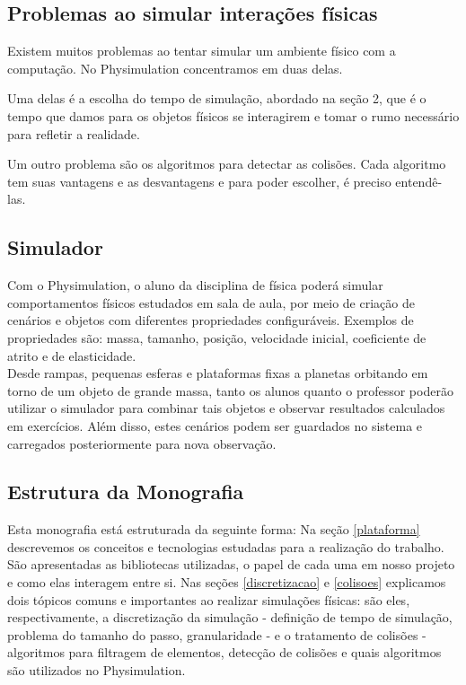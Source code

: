 \subsection{Problemas ao simular interações físicas}
Existem muitos problemas ao tentar simular um ambiente físico com a computação. No Physimulation concentramos em duas delas.

Uma delas é a escolha do tempo de simulação, abordado na seção 2, 
que é o tempo que damos para os objetos físicos se interagirem e tomar o rumo necessário para refletir a realidade.

Um outro problema são os algoritmos para detectar as colisões. Cada algoritmo tem suas vantagens e as desvantagens e para poder escolher, é preciso entendê-las.

\subsection{Simulador}
Com o Physimulation, o aluno da disciplina de física poderá simular comportamentos físicos estudados em sala de aula, por meio de criação de cenários e objetos com diferentes propriedades configuráveis. Exemplos de propriedades são: massa, tamanho, posição, velocidade inicial, coeficiente de atrito e de elasticidade. \\

Desde rampas, pequenas esferas e plataformas fixas a planetas orbitando em torno de um objeto de grande massa, tanto os alunos quanto o professor poderão utilizar o simulador para combinar tais objetos e observar resultados calculados em exercícios. Além disso, estes cenários podem ser guardados no sistema e carregados posteriormente para nova observação.

\subsection{Estrutura da Monografia}
Esta monografia está estruturada da seguinte forma: Na seção \ref{plataforma} descrevemos os conceitos e tecnologias estudadas para a realização do trabalho. São apresentadas as bibliotecas utilizadas, o papel de cada uma em nosso projeto e como elas interagem entre si. Nas seções \ref{discretizacao} e \ref{colisoes} explicamos dois tópicos comuns e importantes ao realizar simulações físicas: são eles, respectivamente, a discretização da simulação - definição de tempo de simulação, problema do tamanho do passo, granularidade - e o tratamento de colisões - algoritmos para filtragem de elementos, detecção de colisões e quais algoritmos são utilizados no Physimulation.  \\

